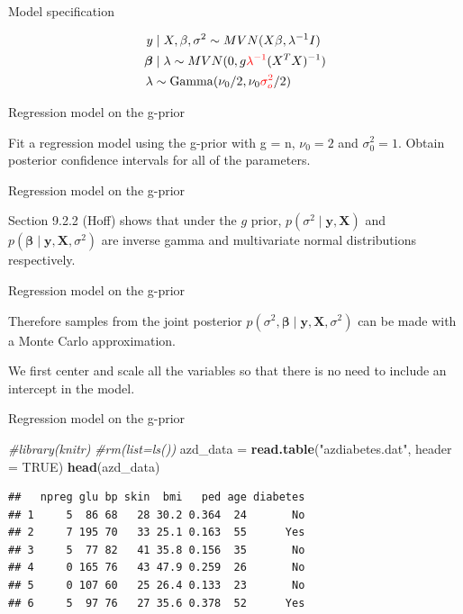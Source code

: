 \documentclass[ignorenonframetext,]{beamer}
\newenvironment{Shaded}{\begin{snugshade}}{\end{snugshade}}
\newcommand{\KeywordTok}[1]{\textcolor[rgb]{0.13,0.29,0.53}{\textbf{#1}}}
\newcommand{\DataTypeTok}[1]{\textcolor[rgb]{0.13,0.29,0.53}{#1}}
\newcommand{\StringTok}[1]{\textcolor[rgb]{0.31,0.60,0.02}{#1}}
\newcommand{\CommentTok}[1]{\textcolor[rgb]{0.56,0.35,0.01}{\textit{#1}}}
\newcommand{\OtherTok}[1]{\textcolor[rgb]{0.56,0.35,0.01}{#1}}
\newcommand{\NormalTok}[1]{#1}
\DeclareMathOperator*{\Ga}{Gamma}
\newcommand{\bbeta}{\bm{\beta}}
\begin{document}
\begin{frame}{Model specification}

\begin{align}
y &\mid X,\beta, \sigma^2 \sim MVN( X\beta, \lambda^{-1} I) \\
\bbeta &\mid \lambda \sim MVN(0, g \textcolor{red}{\lambda^{-1}} (X^TX)^{-1})\\
\lambda &\sim \Ga(\nu_0/2,\nu_0 \textcolor{red}{\sigma_o^2}/2)
\end{align}

\end{frame}

\begin{frame}{Regression model on the g-prior}

Fit a regression model using the g-prior with g = n, \(\nu_0 = 2\) and
\(\sigma_0^2 = 1.\) Obtain posterior confidence intervals for all of the
parameters.

\end{frame}

\begin{frame}{Regression model on the g-prior}

Section 9.2.2 (Hoff) shows that under the \(g\) prior,
\(p(\sigma^{2}\mid\boldsymbol{y},\boldsymbol{X})\) and
\(p(\boldsymbol{\beta}\mid\boldsymbol{y},\boldsymbol{X},\sigma^{2})\)
are inverse gamma and multivariate normal distributions respectively.

\end{frame}

\begin{frame}{Regression model on the g-prior}

Therefore samples from the joint posterior
\(p(\sigma^{2},\boldsymbol{\beta}\mid\boldsymbol{y},\boldsymbol{X},\sigma^{2})\)
can be made with a Monte Carlo approximation.

We first center and scale all the variables so that there is no need to
include an intercept in the model.

\end{frame}

\begin{frame}[fragile]{Regression model on the g-prior}

\begin{Shaded}
\begin{Highlighting}[]
\CommentTok{#library(knitr)}
\CommentTok{#rm(list=ls())}
\NormalTok{azd_data =}\StringTok{ }\KeywordTok{read.table}\NormalTok{(}\StringTok{"azdiabetes.dat"}\NormalTok{, }\DataTypeTok{header =} \OtherTok{TRUE}\NormalTok{)}
\KeywordTok{head}\NormalTok{(azd_data)}
\end{Highlighting}
\end{Shaded}

\begin{verbatim}
##   npreg glu bp skin  bmi   ped age diabetes
## 1     5  86 68   28 30.2 0.364  24       No
## 2     7 195 70   33 25.1 0.163  55      Yes
## 3     5  77 82   41 35.8 0.156  35       No
## 4     0 165 76   43 47.9 0.259  26       No
## 5     0 107 60   25 26.4 0.133  23       No
## 6     5  97 76   27 35.6 0.378  52      Yes
\end{verbatim}

\end{frame}
\end{document}
